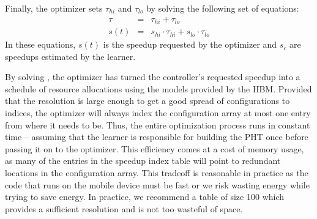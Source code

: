 Finally, the optimizer sets $\tau_{hi}$ and $\tau_{lo}$ by solving the
following set of equations:
\begin{eqnarray}
  \tau &=& \tau_{hi} + \tau_{lo}    \label{eqn:s1} \\
  s(t) &=& s_{hi} \cdot \tau_{hi} + s_{lo} \cdot \tau_{lo} \label{eqn:s2} 
\end{eqnarray}
In these equations, $s(t)$ is the speedup requested by the optimizer
and $s_c$ are speedups estimated by the learner.

By solving , the optimizer has turned the controller's
requested speedup into a schedule of resource allocations using the
models provided by the HBM.  Provided that the resolution is large
enough to get a good spread of configurations to indices, the
optimizer will always index the configuration array at most one entry
from where it needs to be.  Thus, the entire optimization process runs
in constant time -- assuming that the learner is responsible for
building the PHT once before passing it on to the optimizer.  This
efficiency comes at a cost of memory usage, as many of the entries in
the speedup index table will point to redundant locations in the
configuration array.  This tradeoff is reasonable in practice as the
code that runs on the mobile device must be fast or we risk wasting
energy while trying to save energy.  In practice, we recommend a table
of size 100 which provides a sufficient resolution and is not too
wasteful of space.






